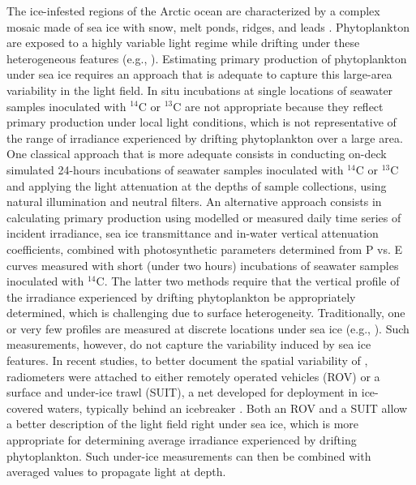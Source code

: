 The ice-infested regions of the Arctic ocean are characterized by a complex mosaic made of sea ice with snow, melt ponds, ridges, and leads \citep{Nicolaus2013, Katlein2015, Katlein2016}. Phytoplankton are exposed to a highly variable light regime while drifting under these heterogeneous features (e.g., \citet{Lange2017}). Estimating primary production of phytoplankton under sea ice requires an approach that is adequate to capture this large-area variability in the light field. In situ incubations at single locations of seawater samples inoculated with $^{14}$C or $^{13}$C are not appropriate because they reflect primary production under local light conditions, which is not representative of the range of irradiance experienced by drifting phytoplankton over a large area. One classical approach that is more adequate consists in conducting on-deck simulated 24-hours incubations of seawater samples inoculated with $^{14}$C or $^{13}$C and applying the light attenuation at the depths of sample collections, using natural illumination and neutral filters. An alternative approach consists in calculating primary production using modelled or measured daily time series of incident irradiance, sea ice transmittance and in-water vertical attenuation coefficients, combined with photosynthetic parameters determined from P vs. E curves measured with short (under two hours) incubations of seawater samples inoculated with $^{14}$C. The latter two methods require that the vertical profile of the irradiance experienced by drifting phytoplankton be appropriately determined, which is challenging due to surface heterogeneity. Traditionally, one or very few \edz{} profiles are measured at discrete locations under sea ice (e.g., \citet{Mundy2009}). Such measurements, however, do not capture the variability induced by sea ice features. In recent studies, to better document the spatial variability of \edz{}, radiometers were attached to either remotely operated vehicles (ROV) \citep{Katlein2015} or a surface and under-ice trawl (SUIT), a net developed for deployment in ice-covered waters, typically behind an icebreaker \citep{Lange2017}. Both an ROV and a SUIT allow a better description of the light field right under sea ice, which is more appropriate for determining average irradiance experienced by drifting phytoplankton. Such under-ice measurements can then be combined with averaged \ked{} values to propagate light at depth.

